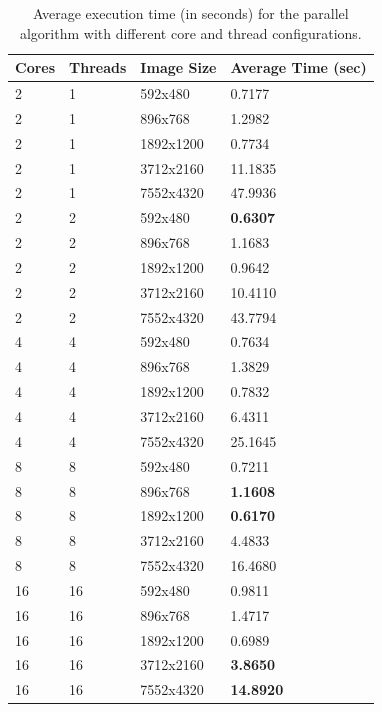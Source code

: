 \documentclass[9pt]{IEEEtran}
\begin{document}
\begin{table}[h]
    \centering
    \caption{Average execution time (in seconds) for the parallel algorithm with different core and thread configurations.}
    \label{tab:parallel}
    \begin{tabular}{|l|l|l|l|}
        \hline
        Cores & Threads & Image Size & Average Time (sec) \\ \hline
        2 & 1 & 592x480 & 0.7177 \\ \hline
        2 & 1 & 896x768 & 1.2982 \\ \hline
        2 & 1 & 1892x1200 & 0.7734 \\ \hline
        2 & 1 & 3712x2160 & 11.1835 \\ \hline
        2 & 1 & 7552x4320 & 47.9936 \\ \hline
        \hline
        2 & 2 & 592x480 & \textbf{0.6307} \\ \hline
        2 & 2 & 896x768 & 1.1683 \\ \hline
        2 & 2 & 1892x1200 & 0.9642 \\ \hline
        2 & 2 & 3712x2160 & 10.4110 \\ \hline
        2 & 2 & 7552x4320 & 43.7794 \\ \hline
        \hline
        4 & 4 & 592x480 & 0.7634 \\ \hline
        4 & 4 & 896x768 & 1.3829 \\ \hline
        4 & 4 & 1892x1200 & 0.7832 \\ \hline
        4 & 4 & 3712x2160 & 6.4311 \\ \hline
        4 & 4 & 7552x4320 & 25.1645 \\ \hline
        \hline
        8 & 8 & 592x480 & 0.7211 \\ \hline
        8 & 8 & 896x768 & \textbf{1.1608} \\ \hline
        8 & 8 & 1892x1200 & \textbf{0.6170} \\ \hline
        8 & 8 & 3712x2160 & 4.4833 \\ \hline
        8 & 8 & 7552x4320 & 16.4680 \\ \hline
        \hline
        16 & 16 & 592x480 & 0.9811 \\ \hline
        16 & 16 & 896x768 & 1.4717 \\ \hline
        16 & 16 & 1892x1200 & 0.6989 \\ \hline
        16 & 16 & 3712x2160 & \textbf{3.8650} \\ \hline
        16 & 16 & 7552x4320 & \textbf{14.8920} \\ \hline
    \end{tabular}
\end{table}
\end{document}
